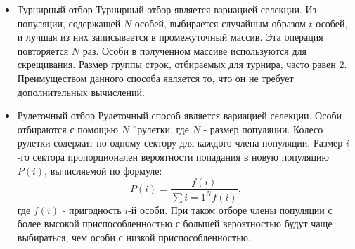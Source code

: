 \begin{itemize}
\begin{itemize}[label=$\ast$]
	\item Турнирный отбор
Турнирный отбор является вариацией селекции. Из популяции, содержащей $N$ особей, выбирается случайным образом $t$ особей, и лучшая из них записывается в промежуточный массив. Эта операция повторяется $N$ раз. Особи в полученном массиве используются для скрещивания. Размер группы строк, отбираемых для турнира, часто равен 2. Преимуществом данного способа является то, что он не требует дополнительных вычислений.
	\item Рулеточный отбор
Рулеточный способ является вариацией селекции. Особи отбираются с помощью $N$ \textquotedblright рулетки, где $N$ - размер популяции. Колесо рулетки содержит по одному сектору для каждого члена популяции. Размер $i$-го сектора пропорционален вероятности попадания в новую популяцию $P(i)$, вычисляемой по формуле:
\begin{equation}
	P(i) = \frac{f(i)}{\sum{i=1}^{N} f(i)},
\end{equation}
где $f(i)$ - пригодность $i$-й особи.
При таком отборе члены популяции с более высокой приспособленностью с большей вероятностью будут чаще выбираться, чем особи с низкой приспособленностью.
\end{itemize}


\end{itemize}
